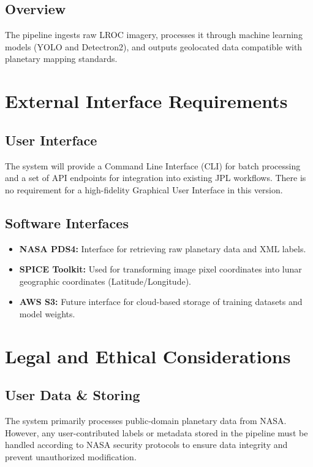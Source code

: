 \documentclass[12pt]{article}
\begin{document}
\subsection{Overview}
The pipeline ingests raw LROC imagery, processes it through machine learning models (YOLO and Detectron2), and outputs geolocated data compatible with planetary mapping standards.

\section{External Interface Requirements}
\subsection{User Interface}
The system will provide a Command Line Interface (CLI) for batch processing and a set of API endpoints for integration into existing JPL workflows. There is no requirement for a high-fidelity Graphical User Interface in this version.

\subsection{Software Interfaces}
\begin{itemize}
    \item \textbf{NASA PDS4:} Interface for retrieving raw planetary data and XML labels.
    \item \textbf{SPICE Toolkit:} Used for transforming image pixel coordinates into lunar geographic coordinates (Latitude/Longitude).
    \item \textbf{AWS S3:} Future interface for cloud-based storage of training datasets and model weights.
\end{itemize}

\section{Legal and Ethical Considerations}
\subsection{User Data \& Storing}
The system primarily processes public-domain planetary data from NASA. However, any user-contributed labels or metadata stored in the pipeline must be handled according to NASA security protocols to ensure data integrity and prevent unauthorized modification.
\end{document}
